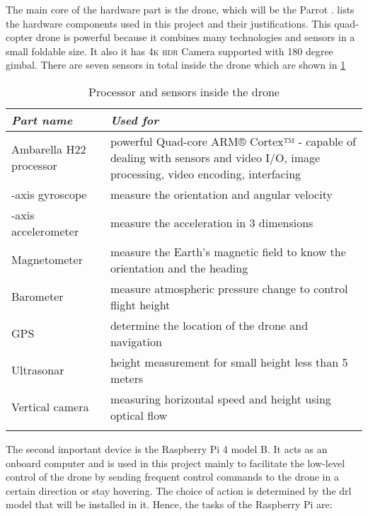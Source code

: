 \documentclass[../main.tex]{subfiles}
\begin{document}
The main core of the hardware part is the drone, 
which will be the Parrot \anafi.
 lists the hardware components
used in this project and their justifications. This quad-copter
drone is powerful because it combines many technologies 
and sensors in a small foldable size. It also it has 4\textsc{k}
\textsc{hdr} Camera supported with 180 degree gimbal. 
There are seven sensors in total inside the drone which are shown in 
\cref{tab:sensors-table} 


\begin{table}[tbp]
	\centering
	\caption{Processor and sensors inside the drone}
	\label{tab:sensors-table}  
	\begin{tabular}{ p{4cm} p{8cm} }
		\toprule
		\textit{Part name} 
		& \textit{Used for}  \\ 
		
		\midrule
		\raggedright Ambarella H22 
		processor
		& powerful Quad-core ARM® Cortex™ - capable of dealing with sensors and video I/O, 
		image processing, video encoding, interfacing \\ 
                \addlinespace
		3-axis gyroscope
		& measure the orientation and angular velocity  \\ 
                \addlinespace
		3-axis accelerometer
		& measure the acceleration in 3 dimensions  \\ 
                \addlinespace
		Magnetometer 
		& measure the Earth's magnetic field to know the orientation and the heading   \\ 
                \addlinespace
				Barometer 
		& measure atmospheric pressure change to control flight height   \\ 
                \addlinespace
				GPS 
		& determine the location of the drone and navigation  \\ 
                \addlinespace
				Ultrasonar 
		&  height measurement for small height less than 5 meters  \\ 
                \addlinespace
				Vertical camera 
		&  measuring horizontal speed and height using optical flow \\ 
                \addlinespace
        \bottomrule
    \end{tabular}
\end{table}   

The second important device is the Raspberry Pi 4 model B. It 
acts as an onboard computer and is used in this project
mainly to facilitate the low-level control of the drone
by sending frequent control commands to the drone
in a certain direction or stay hovering.
The choice of action is determined by the \gls{drl}
model that will be installed in it.
Hence, the tasks of the Raspberry Pi are: 
\end{document}

